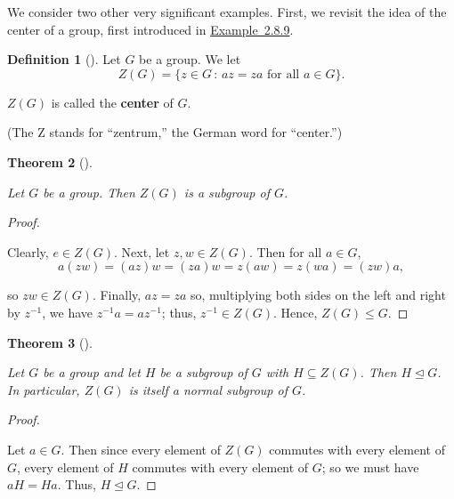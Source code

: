 \documentclass[10pt,]{book}
\newcommand{\terminology}[1]{\textbf{#1}}
\theoremstyle{plain}
\newtheorem{theorem}{Theorem}[section]
\theoremstyle{definition}
\newtheorem{definition}[theorem]{Definition}
\theoremstyle{definition}
\theoremstyle{definition}
\theoremstyle{definition}
\numberwithin{equation}{section}
\begin{document}
    We consider two other very significant examples. First, we revisit the idea of the center of a group, first introduced in \hyperlink{zgdef}{Example~2.8.9}.
\begin{definition}[{}]\label{definition-65}
 Let \(G\)
    be a group. We let
\begin{equation*}

      Z(G)=\{z\in G\,:\, az=za \text{ for all } a\in
      G\}.
    
\end{equation*}

    \(Z(G)\) is called the \terminology{center} of \(G\).%
\par
(The Z stands for ``zentrum,'' the German word for ``center.'')
\end{definition}
\begin{theorem}[{}]\label{theorem-49}

        Let \(G\) be a group. Then \(Z(G)\) is a subgroup of \(G\).
\end{theorem}
\begin{proof}\hypertarget{proof-43}{}

      Clearly,
      \(e\in Z(G)\). Next, let \(z,w\in Z(G)\). Then for all \(a \in G\),
\begin{equation*}

        a(zw)=(az)w=(za)w=z(aw)=z(wa)=(zw)a,
      
\end{equation*}

      so \(zw\in Z(G)\). Finally, \(az=za\) so, multiplying both
      sides on the left and right by \(z^{-1}\), we have \(z^{-1}a=az^{-1}\);
      thus, \(z^{-1}\in Z(G)\). Hence, \(Z(G)\leq G\).
\end{proof}
\begin{theorem}[{}]\label{znorm}

        Let \(G\) be a group and let \(H\) be a subgroup of \(G\) with \(H\subseteq Z(G)\). Then \(H\unlhd G\). In particular, \(Z(G)\) is itself a normal
        subgroup of \(G\).
\end{theorem}
\begin{proof}\hypertarget{proof-44}{}

      Let \(a\in G\).
      Then since every element of \(Z(G)\) commutes with every element of
      \(G\), every element of \(H\) commutes with every element of \(G\); so we must have \(aH=Ha\). Thus,
      \(H\unlhd G\).
\end{proof}
\par
\end{document}
